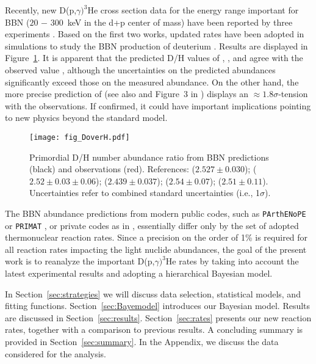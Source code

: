 \documentclass[twocolumn]{aastex63}
\begin{document}
Recently, new D(p,$\gamma)^3$He cross section data for the energy range important for BBN ($20$ $-$ $300$~keV in the d+p center of mass) have been reported by three experiments \citep{Tisma:2019ug,Mossa20,Turkat21}. Based on the first two works, updated rates have been adopted in simulations to study the BBN production of deuterium \citep{Mossa20,Pit21,Pis21,Yeh21}. Results are displayed in Figure~\ref{fig:DoverH}. It is apparent that the predicted D/H values of \citet{Mossa20}, \citet{Pis21}, and \citet{Yeh21} agree with the observed value \citep{Cooke2018}, although the uncertainties on the predicted abundances significantly exceed those on the measured abundance. On the other hand, the more precise prediction of \citet{Pit21} (see also \citet{Coc15} and Figure~3 in \citet{IC20}) displays an $\approx1.8\sigma$-tension with the observations. If confirmed, it could have important implications pointing to new physics beyond the standard model.
%
\begin{figure}
\texttt{[image: fig\_DoverH.pdf]}
\caption{Primordial D/H number abundance ratio from BBN predictions (black) and observations (red). References: \citet{Cooke2018} ($2.527\pm 0.030$); \citet{Mossa20} ($2.52\pm0.03\pm0.06$); \citet{Pit21} ($2.439\pm0.037$);  \citet{Pis21} ($2.54\pm0.07$); \citet{Yeh21} ($2.51\pm0.11$). Uncertainties refer to combined standard uncertainties (i.e., 1$\sigma$).}
\label{fig:DoverH}
\end{figure}

The BBN abundance predictions from modern public codes, such as {\tt PArthENoPE} \citep{Parthenope2,Parthenope3} or {\tt PRIMAT} \citep{Pitrou2018}, or private codes as in \citet{Yeh21},
essentially differ only by the set of adopted thermonuclear reaction rates.
Since a precision on the order of 1\% is required for all reaction rates impacting the light nuclide abundances, the goal of the present work is to reanalyze the important D(p,$\gamma)^3$He rates by taking into account the latest experimental results \citep{Tisma:2019ug,Mossa20,Turkat21} and adopting a hierarchical Bayesian model.

In Section~\ref{sec:strategies} we will discuss data selection, statistical models, and fitting functions. Section~\ref{sec:Bayemodel} introduces our Bayesian model. Results are discussed in Section~\ref{sec:results}. Section~\ref{sec:rates} presents our new reaction rates, together with a comparison to previous results. A concluding summary is provided in Section~\ref{sec:summary}. In the Appendix, we discuss the data considered for the analysis.
\end{document}
